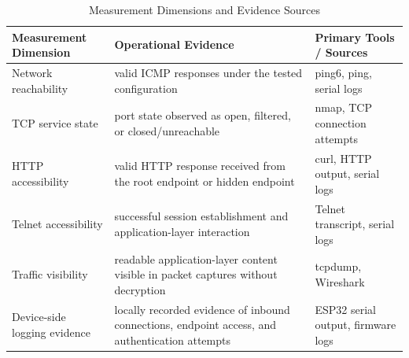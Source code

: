 \begin{table}[H]
    \centering
    \caption{Measurement Dimensions and Evidence Sources}
    \label{tab:measurement-dimensions}
    \begin{tabularx}{\textwidth}{L L L}
        \toprule
        \textbf{\color{white}Measurement Dimension} & \textbf{\color{white}Operational Evidence} & \textbf{\color{white}Primary Tools / Sources} \\
        \midrule
        Network reachability & valid ICMP responses under the tested configuration & ping6, ping, serial logs \\
        TCP service state & port state observed as open, filtered, or closed/unreachable & nmap, TCP connection attempts \\
        HTTP accessibility & valid HTTP response received from the root endpoint or hidden endpoint & curl, HTTP output, serial logs \\
        Telnet accessibility & successful session establishment and application-layer interaction & Telnet transcript, serial logs \\
        Traffic visibility & readable application-layer content visible in packet captures without decryption & tcpdump, Wireshark \\
        Device-side logging evidence & locally recorded evidence of inbound connections, endpoint access, and authentication attempts & ESP32 serial output, firmware logs \\
        \bottomrule
    \end{tabularx}
\end{table}
